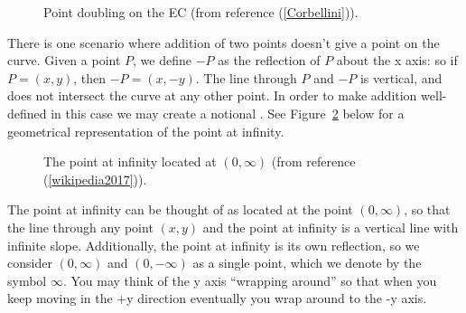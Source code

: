 \begin{figure}[htbp]
	  \caption{\label{fig:DH:DHKE_7}Point doubling on the EC (from reference (\ref{Corbellini})).}
\end{figure}
There is one scenario where addition of two points doesn't give a point on the curve. Given a point $P$, we define  $-P$ as the reflection of $P$ about the x axis: so  if $P = (x, y)$, then $-P = (x, -y)$. The line through $P$ and $-P$ is vertical, and does not intersect the curve at any other point.  In order to make addition well-defined in this case we may create a notional . See Figure~\ref{fig:DH:DHKE_19} below for a geometrical representation of the point at infinity.
\begin{figure}[htbp]
	  \caption{\label{fig:DH:DHKE_19}The point at infinity located at $(0,\infty)$ (from reference (\ref{wikipedia2017})).}
\end{figure}
The point at infinity can be thought of as located at the point $(0,\infty)$, so that the line through any point $(x, y)$ and the point at infinity is a vertical line with infinite slope. Additionally, the point at infinity is its own reflection, so we consider $(0,\infty)$ and $(0,-\infty)$ as a single point, which we denote by the symbol $\infty$. You may think of the y  axis ``wrapping around'' so that when you keep moving in the +y direction eventually you wrap around to the -y axis.
